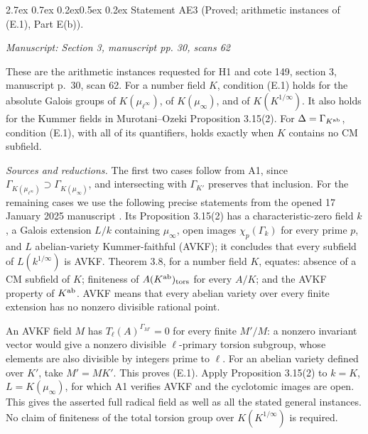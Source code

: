 \documentclass[11pt,a4paper]{article}
\makeatletter
\newcommand{\passage}[1]{\par\smallskip\noindent\textit{Manuscript: #1}\par\smallskip}
\renewcommand\paragraph{\@startsection{paragraph}{4}{\z@}%
  {2.7ex \@plus 0.7ex \@minus 0.2ex}{0.5ex \@plus 0.2ex}%
  {\normalfont\normalsize\bfseries}}
\makeatother
\begin{document}
\paragraph{Statement AE3 (Proved; arithmetic instances of (E.1), Part E(b)).}\label{res:AE3}
\passage{Section 3, manuscript pp. 30, scans 62}

These are the arithmetic instances requested for H1 and cote 149, section 3, manuscript p.~30, scan 62.
For a number field $K$, condition (E.1) holds for the absolute Galois groups of $K(\mu_{\ell^\infty})$, of $K(\mu_\infty)$, and of $K(K^{1/\infty})$. It also holds for the Kummer fields in Murotani--Ozeki Proposition 3.15(2). For $\Delta=\Gamma_{K^{\rm ab}}$, condition (E.1), with all of its quantifiers, holds exactly when $K$ contains no CM subfield.

\emph{Sources and reductions.} The first two cases follow from A1, since $\Gamma_{K(\mu_{\ell^\infty})}\supset\Gamma_{K(\mu_\infty)}$, and intersecting with $\Gamma_{K'}$ preserves that inclusion. For the remaining cases we use the following precise statements from the opened 17 January 2025 manuscript \cite{MurotaniOzeki2025}. Its Proposition 3.15(2) has a characteristic-zero field $k$, a Galois extension $L/k$ containing $\mu_\infty$, open images $\chi_p(\Gamma_k)$ for every prime $p$, and $L$ abelian-variety Kummer-faithful (AVKF); it concludes that every subfield of $L(k^{1/\infty})$ is AVKF. Theorem 3.8, for a number field $K$, equates: absence of a CM subfield of $K$; finiteness of $A(K^{\rm ab})_{\rm tors}$ for every $A/K$; and the AVKF property of $K^{\rm ab}$. AVKF means that every abelian variety over every finite extension has no nonzero divisible rational point.

An AVKF field $M$ has $T_\ell(A)^{\Gamma_{M'}}=0$ for every finite $M'/M$: a nonzero invariant vector would give a nonzero divisible $\ell$-primary torsion subgroup, whose elements are also divisible by integers prime to $\ell$. For an abelian variety defined over $K'$, take $M'=MK'$. This proves (E.1). Apply Proposition 3.15(2) to $k=K$, $L=K(\mu_\infty)$, for which A1 verifies AVKF and the cyclotomic images are open. This gives the asserted full radical field as well as all the stated general instances. No claim of finiteness of the total torsion group over $K(K^{1/\infty})$ is required.
\end{document}
